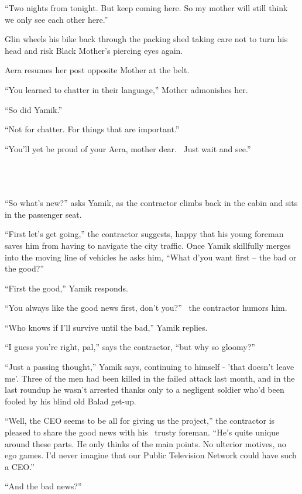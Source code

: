 \documentclass[twoside,11pt]{book}
\begin{document}
``Two nights from tonight. But keep coming here. So my mother will still think we only see each other
here.''

Glin wheels his bike back through the packing shed taking care not to turn his head and risk Black Mother's piercing
eyes again.

Aera resumes her post opposite Mother at the belt.

``You learned to chatter in their language,'' Mother admonishes her.

``So did Yamik.''

``Not for chatter. For things that are important.''

``You'll yet be proud of your Aera, mother dear.~ Just wait and see.''

~

\chapter{}

``So what's new?'' asks Yamik, as the contractor climbs back in the cabin and sits in the
passenger seat.

``First let's get going,'' the contractor suggests, happy that his young foreman saves him
from having to navigate the city traffic. Once Yamik skillfully merges into the moving line of vehicles he asks him,
``What d'you want first -- the bad or the good?''

``First the good,'' Yamik responds.

``You always like the good news first, don't you?'' \ the contractor humors him.

``Who knows if I'll survive until the bad,'' Yamik replies.{ }

``I guess you're right, pal,'' says the contractor, ``but why so
gloomy?''

``Just a passing thought,'' Yamik says, continuing to himself - 'that doesn't leave me'. Three
of the men had been killed in the failed attack last month, and in the last roundup he wasn't arrested thanks only to a
negligent soldier who'd been fooled by his blind old Balad get-up.

``Well, the CEO seems to be all for giving us the project,'' the contractor is pleased to
share the good news with his \ trusty foreman. ``He's quite unique around these parts. He only thinks of
the main points. No ulterior motives, no ego games. I'd never imagine that our Public Television Network could have
such a CEO.''

``And the bad news?''
\end{document}
